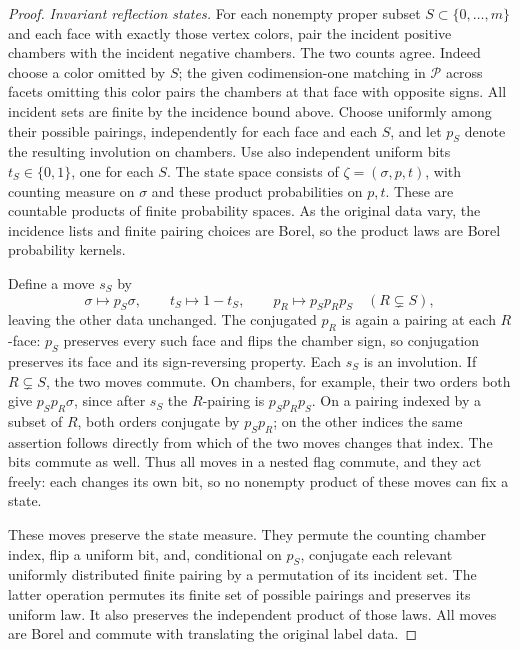 \begin{proof}
\emph{Invariant reflection states.}
For each nonempty proper subset
\(S\subset\{0,\ldots,m\}\) and each face with exactly those vertex
colors, pair the incident positive chambers with the incident negative
chambers.  The two counts agree.  Indeed choose a color omitted by
\(S\); the given codimension-one matching in \(\mathcal P\) across
facets omitting this color pairs the chambers at that face with opposite
signs.  All incident sets are
finite by the incidence bound above.  Choose uniformly among their
possible pairings, independently for each face and each \(S\), and
let \(p_S\) denote the resulting involution on chambers.  Use also
independent uniform bits \(t_S\in\{0,1\}\), one for each \(S\).
The state space consists of \(\zeta=(\sigma,p,t)\), with counting measure
on \(\sigma\) and these product probabilities on \(p,t\).  These
are countable products of finite probability spaces.  As the original
data vary, the incidence lists and finite pairing choices are Borel,
so the product laws are Borel probability kernels.

Define a move \(s_S\) by
\[
 \sigma\longmapsto p_S\sigma,\qquad t_S\longmapsto1-t_S,
 \qquad p_R\longmapsto p_Sp_Rp_S\quad(R\subsetneq S),
\]
leaving the other data unchanged.  The conjugated \(p_R\) is again
a pairing at each \(R\)-face: \(p_S\) preserves every such face and
flips the chamber sign, so conjugation preserves its face and its
sign-reversing property.  Each \(s_S\) is an involution.  If
\(R\subsetneq S\), the two moves commute.  On chambers, for example,
their two orders both give \(p_Sp_R\sigma\), since after \(s_S\) the
\(R\)-pairing is \(p_Sp_Rp_S\).  On a pairing indexed by a subset of
\(R\), both orders conjugate by \(p_Sp_R\); on the other indices the
same assertion follows directly from which of the two moves changes
that index.  The bits commute as well.  Thus all moves in a nested
flag commute, and they act freely: each changes its own bit, so no
nonempty product of these moves can fix a state.

These moves preserve the state measure.  They permute the counting
chamber index, flip a uniform bit, and, conditional on \(p_S\),
conjugate each relevant uniformly distributed finite pairing by a
permutation of its incident set.  The latter operation permutes its
finite set of possible pairings and preserves its uniform law.  It
also preserves the independent product of those laws.  All moves are
Borel and commute with translating the original label data.


\end{proof}
